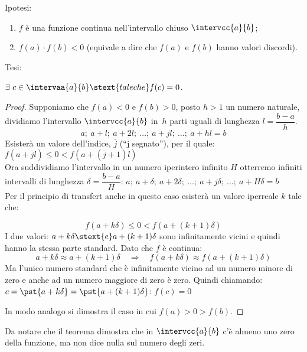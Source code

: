\noindent Ipotesi: \nopagebreak
\begin{enumerate}[nosep]
 \item \(f\) è una funzione continua nell'intervallo chiuso 
\(\intervcc{a}{b}\);
 \item \(f(a) \cdot f(b) < 0\) 
 (equivale a dire che \(f(a)\) e \(f(b)\) hanno valori discordi).
\end{enumerate}

\noindent Tesi: 

\(\exists~c \in \intervaa{a}{b} \stext{ tale che } f(c)=0\).

\begin{proof}
Supponiamo che \(f(a)<0\) e \(f(b)>0\), posto \(h > 1\) un numero naturale, 
dividiamo l'intervallo \(\intervcc{a}{b}\) in~\(h\) parti uguali 
di lunghezza \(l = \dfrac{b -a}{h}\).
\[a;~a+l;~a+2l;~\dots;~a+jl;~\dots;~a+hl=b\]
Esisterà un valore dell'indice, \(\overline{j}\) 
(``j segnato''), per il quale: \qquad
\(f(a+\overline{j}l) \leqslant 0 < f(a+(\overline{j}+1)l)\)\\
Ora suddividiamo l'intervallo in un numero iperintero infinito \(H\) 
otterremo infiniti intervalli di lunghezza \(\delta = \dfrac{b -a}{H}\):
\qquad \(a;~a+\delta;~a+2\delta;~\dots;~a+j\delta;~\dots;~a+H\delta=b\)\\
Per il principio di transfert anche in questo caso esisterà un valore 
iperreale \(k\) tale che:

\noindent\begin{minipage}{.58\textwidth}
\[f(a+k\delta) \leqslant 0 < f(a+(k+1)\delta)\]
I due valori: \(a+k\delta \stext{ e }a+(k+1)\delta\) sono infinitamente 
vicini e quindi hanno la stessa parte standard.
Dato che \(f\) è continua:
\[a+k\delta \approx a+(k+1)\delta \quad \Rightarrow \quad 
f(a+k\delta) \approx f(a+(k+1)\delta)\] 
Ma l'unico numero standard che è infinitamente vicino ad un numero
minore di zero e anche ad un numero maggiore di zero è zero. 
Quindi chiamando: \(c=\pst{a+k\delta}=\pst{a+(k+1)\delta}\): \quad 
\(f(c)=0\)
\end{minipage}
\hfill
\begin{minipage}{.38\textwidth}
\begin{center} \tzeri \end{center}
\end{minipage}

In modo analogo si dimostra il caso in cui \(f(a)>0>f(b)\).
\end{proof}
Da notare che il teorema dimostra che in \(\intervcc{a}{b}\) c'è almeno uno 
zero della funzione, ma non dice nulla sul numero degli zeri.

